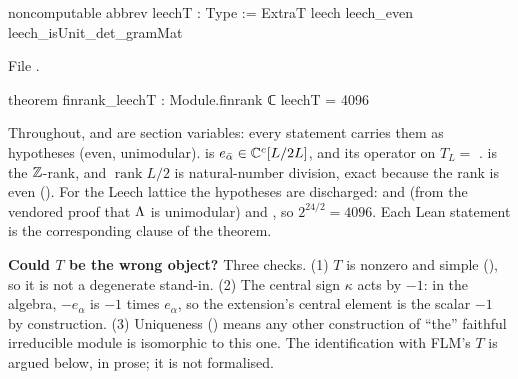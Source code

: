 \begin{leancode}
noncomputable abbrev leechT : Type := ExtraT leech leech_even leech_isUnit_det_gramMat
\end{leancode}
\noindent File .
\begin{leancode}
theorem finrank_leechT : Module.finrank ℂ leechT = 4096
\end{leancode}
\begin{dictionary}
Throughout,  and  are section variables:
every statement carries them as hypotheses (even, unimodular).   is
$e_{\bar\alpha}\in{\mathbb{C}}^c[L/2L]$, and  its operator on $T_L=$ .
 is the ${\mathbb{Z}}$-rank, and $\operatorname{rank}L/2$ is natural-number division, exact
because the rank is even ().  For the Leech lattice the hypotheses
are discharged:  and  (from the vendored proof that
${\Lambda}$ is unimodular) and , so $2^{24/2}=4096$.  Each Lean
statement is the corresponding clause of the theorem.

\textbf{Could $T$ be the wrong object?}  Three checks.  (1) $T$ is nonzero and simple
(), so it is not a degenerate stand-in.  (2) The central sign
$\kappa$ acts by $-1$: in the algebra, $-e_\alpha$ is $-1$ times $e_\alpha$, so the extension's
central element is the scalar $-1$ by construction.  (3) Uniqueness
() means any other construction of ``the'' faithful irreducible
module is isomorphic to this one.  The identification with FLM's $T$ is argued below, in prose; it
is not formalised.
\end{dictionary}


